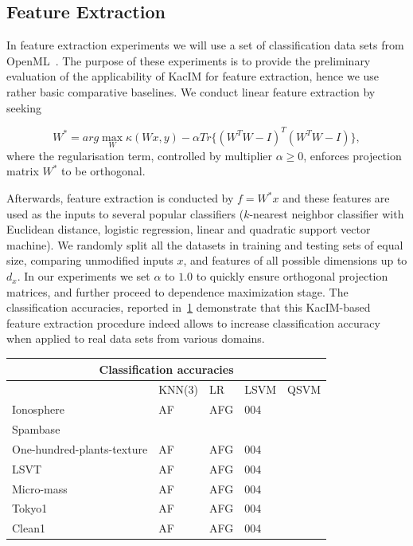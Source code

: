 \documentclass{article}
\begin{document}
\subsection{Feature Extraction}
In feature extraction experiments we will use a set of classification data sets from OpenML~\cite{OpenML2013}. The purpose of these experiments is to provide the preliminary evaluation of the applicability of KacIM for feature extraction, hence we use rather basic comparative baselines. We conduct linear feature extraction by seeking 

\begin{equation}
\label{eq:kim_feature_extraction}    
W^{*} = arg \max_{W} \kappa(Wx, y) - \alpha Tr\{(W^{T}W-I)^{T}(W^{T}W-I) \},
\end{equation}
where the regularisation term, controlled by multiplier $\alpha \geq 0$, enforces projection matrix $W^{*}$ to be orthogonal.


\noindent Afterwards, feature extraction is conducted by $f = W^{*}x$ and these features are used as the inputs to several popular classifiers ($k$-nearest neighbor classifier with Euclidean distance, logistic regression, linear and quadratic support vector machine\cite{?}). We randomly split all the datasets in training and testing sets of equal size, comparing unmodified inputs $x$, and features of all possible dimensions up to $d_{x}$.  In our experiments we set $\alpha$ to $1.0$ to quickly ensure orthogonal projection matrices, and further proceed to dependence maximization stage. 
The classification accuracies, reported in~\ref{table:classification_accuracies} demonstrate that this KacIM-based feature extraction procedure indeed allows to increase classification accuracy when applied to real data sets from various domains.

\begin{table}
\label{table:classification_accuracies}	
\begin{tabular}{ |p{2.5cm}||p{2cm}|p{1cm}|p{1cm}|p{1cm}|  }
	\hline
	\multicolumn{5}{|c|}{Classification accuracies} \\
	\hline
	 & KNN(3) & LR & LSVM & QSVM  \\
	\hline
	Ionosphere   & AF    &AFG&   004 & \\	
	\hline
	Spambase & & & & \\
	\hline
	One-hundred-plants-texture   & AF    &AFG&   004 & \\
	\hline	
	LSVT   & AF    &AFG&   004 & \\
	\hline
	Micro-mass   & AF    &AFG&   004 & \\
	\hline	
	Tokyo1   & AF    &AFG&   004 & \\
	\hline	
	Clean1   & AF    &AFG&   004 & \\
	\hline
\end{tabular}
\end{table}
\end{document}
